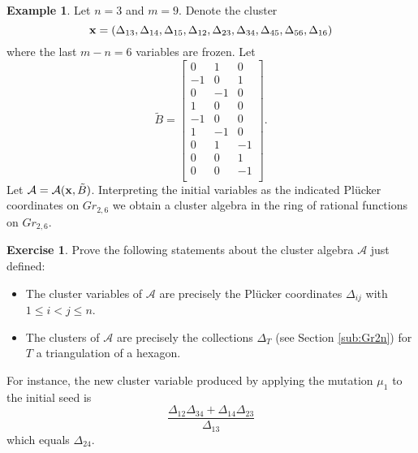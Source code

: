 \documentclass{amsart}
\theoremstyle{definition}
\newtheorem{example}[theorem]{Example}
\newtheorem{subexercise}{Exercise}[theorem]
\theoremstyle{remark}
\numberwithin{equation}{section}
\newcommand{\cA}{{\mathcal{A}}}
\newcommand{\x}{{\bf x}}
\begin{document}
	\begin{example}
		Let $n=3$ and $m=9$.  Denote the cluster 
		\begin{displaymath}
			\x = (\Delta_{13},\Delta_{14},\Delta_{15}, \Delta_{12},\Delta_{23},\Delta_{34},\Delta_{45},\Delta_{56},\Delta_{16})
		\end{displaymath}
		where the last $m-n=6$ variables are frozen.  Let
		\begin{displaymath}
			\tilde{B} = \left[\begin{array}{ccc}
			0 & 1 & 0 \\
			-1 & 0 & 1 \\
			0 & -1 & 0 \\
			1 & 0 & 0 \\
			-1 & 0 & 0 \\
			1 & -1 & 0 \\
			0 & 1 & -1 \\
			0 & 0 & 1 \\
			0 & 0 & -1 \\
			\end{array}
			\right].
		\end{displaymath}
		Let $\cA = \cA(\x,\tilde{B})$.  Interpreting the initial variables as the indicated Pl\"ucker coordinates on $Gr_{2,6}$ we obtain a cluster algebra in the ring of rational functions on $Gr_{2,6}$.
		\begin{subexercise}
      Prove the following statements about the cluster algebra $\cA$ just defined:
			\begin{itemize}
			\item The cluster variables of $\cA$ are precisely the Pl\"ucker coordinates $\Delta_{ij}$ with $1 \leq i < j \leq n$.
			\item The clusters of $\cA$ are precisely the collections $\Delta_T$ (see Section \ref{sub:Gr2n}) for $T$ a triangulation of a hexagon. 
			\end{itemize}
		\end{subexercise}
		For instance, the new cluster variable produced by applying the mutation $\mu_1$ to the initial seed is
		\begin{displaymath}
		\frac{\Delta_{12}\Delta_{34} + \Delta_{14}\Delta_{23}}{\Delta_{13}}
		\end{displaymath}
		which equals $\Delta_{24}$.
	\end{example}
	
\end{document}
